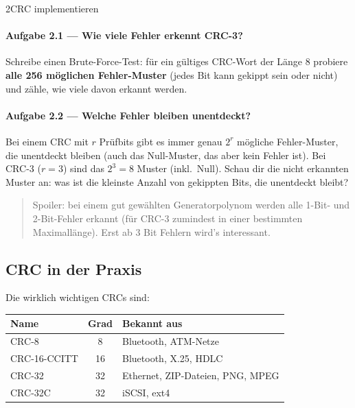 \begin{pythoneinheit}{2}{CRC implementieren}

\paragraph{Aufgabe 2.1 — Wie viele Fehler erkennt CRC-3?}
Schreibe einen Brute-Force-Test: für ein gültiges CRC-Wort der Länge
8 probiere \textbf{alle 256 möglichen Fehler-Muster} (jedes Bit kann
gekippt sein oder nicht) und zähle, wie viele davon erkannt werden.


\paragraph{Aufgabe 2.2 — Welche Fehler bleiben unentdeckt?}
Bei einem CRC mit $r$ Prüfbits gibt es immer genau $2^r$ mögliche
Fehler-Muster, die unentdeckt bleiben (auch das Null-Muster, das aber
kein Fehler ist). Bei CRC-3 ($r = 3$) sind das $2^3 = 8$ Muster (inkl.\
Null). Schau dir die nicht erkannten Muster an: was ist die kleinste
Anzahl von gekippten Bits, die unentdeckt bleibt?

\begin{quote}
Spoiler: bei einem gut gewählten Generatorpolynom werden alle 1-Bit-
und 2-Bit-Fehler erkannt (für CRC-3 zumindest in einer bestimmten
Maximallänge). Erst ab 3 Bit Fehlern wird's interessant.
\end{quote}
\end{pythoneinheit}

\subsection*{CRC in der Praxis}

Die wirklich wichtigen CRCs sind:

\begin{center}
\begin{tabular}{lcl}
  \toprule
  Name           & Grad & Bekannt aus \\
  \midrule
  CRC-8          & 8    & Bluetooth, ATM-Netze \\
  CRC-16-CCITT   & 16   & Bluetooth, X.25, HDLC \\
  CRC-32         & 32   & Ethernet, ZIP-Dateien, PNG, MPEG \\
  CRC-32C        & 32   & iSCSI, ext4 \\
  \bottomrule
\end{tabular}
\end{center}

